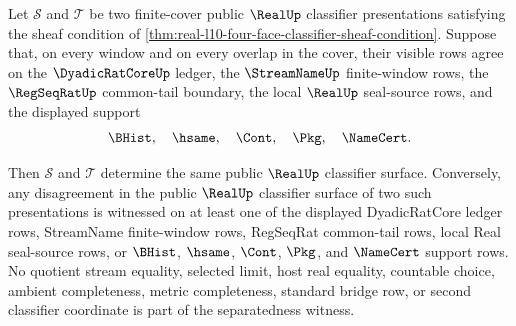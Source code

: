 \begin{theorem}
\label{thm:real-l10-four-face-classifier-separatedness}
Let $\mathcal S$ and $\mathcal T$ be two finite-cover public $\RealUp$ classifier presentations satisfying the sheaf condition of \autoref{thm:real-l10-four-face-classifier-sheaf-condition}. Suppose that, on every window and on every overlap in the cover, their visible rows agree on the $\DyadicRatCoreUp$ ledger, the $\StreamNameUp$ finite-window rows, the $\RegSeqRatUp$ common-tail boundary, the local $\RealUp$ seal-source rows, and the displayed support
$$
\BHist,\quad \hsame,\quad \Cont,\quad \Pkg,\quad \NameCert.
$$

Then $\mathcal S$ and $\mathcal T$ determine the same public $\RealUp$ classifier surface. Conversely, any disagreement in the public $\RealUp$ classifier surface of two such presentations is witnessed on at least one of the displayed DyadicRatCore ledger rows, StreamName finite-window rows, RegSeqRat common-tail rows, local Real seal-source rows, or $\BHist$, $\hsame$, $\Cont$, $\Pkg$, and $\NameCert$ support rows. No quotient stream equality, selected limit, host real equality, countable choice, ambient completeness, metric completeness, standard bridge row, or second classifier coordinate is part of the separatedness witness.
\end{theorem}
